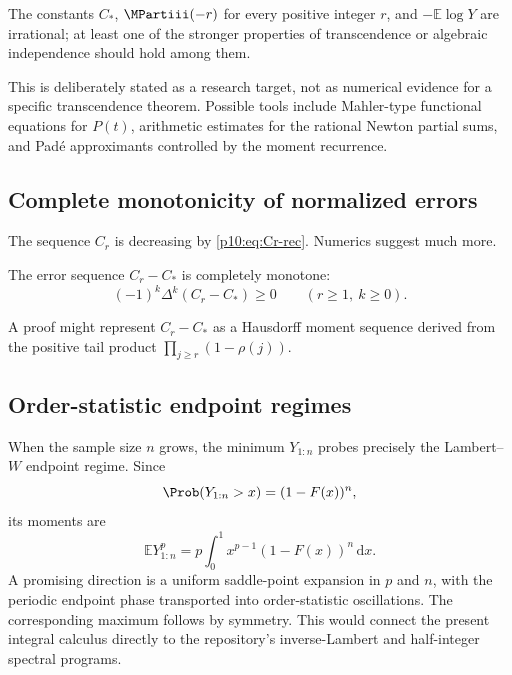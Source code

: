 \documentclass[11pt,oneside]{article}
\theoremstyle{definition}
\theoremstyle{remark}
\newcommand{\F}{F}
\newcommand{\E}{\mathbb E}
\newcommand{\dd}{\,\mathrm d}
\newcommand{\1}{\mathbf 1}
\begin{document}
\begin{conjecture}\label{p10:conj:irrationality}
The constants \(C_*\), \(\MPartiii(-r)\) for every positive integer \(r\), and
\(-\E\log Y\) are irrational; at least one of the stronger properties of
transcendence or algebraic independence should hold among them.
\end{conjecture}

This is deliberately stated as a research target, not as numerical evidence for a
specific transcendence theorem.  Possible tools include Mahler-type functional
equations for \(P(t)\), arithmetic estimates for the rational Newton partial sums, and
Pad\'e approximants controlled by the moment recurrence.

\subsection{Complete monotonicity of normalized errors}

The sequence \(C_r\) is decreasing by \cref{p10:eq:Cr-rec}.  Numerics suggest much more.

\begin{conjecture}\label{p10:conj:complete-monotone}
The error sequence \(C_r-C_*\) is completely monotone:
\begin{equation}\label{p10:eq:complete-monotone-conj}
 (-1)^k\Delta^k(C_r-C_*)\ge0
 \qquad(r\ge1,\ k\ge0).
\end{equation}
\end{conjecture}

A proof might represent \(C_r-C_*\) as a Hausdorff moment sequence derived from the
positive tail product \(\prod_{j\ge r}(1-\rho(j))\).

\subsection{Order-statistic endpoint regimes}

When the sample size \(n\) grows, the minimum \(Y_{1:n}\) probes precisely the
Lambert--\(W\) endpoint regime.  Since
\[
 \Prob(Y_{1:n}>x)=(1-\F(x))^n,
\]
its moments are
\begin{equation}\label{p10:eq:min-order-moment}
 \E Y_{1:n}^p=p\int_0^1x^{p-1}(1-\F(x))^n\dd x.
\end{equation}
A promising direction is a uniform saddle-point expansion in \(p\) and \(n\), with the
periodic endpoint phase transported into order-statistic oscillations.  The corresponding
maximum follows by symmetry.  This would connect the present integral calculus directly
to the repository's inverse-Lambert and half-integer spectral programs.
\end{document}
